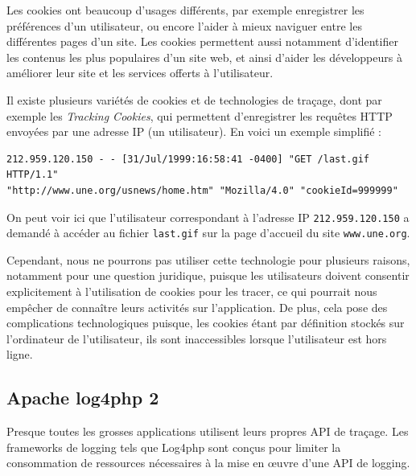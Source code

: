             Les cookies ont beaucoup d'usages différents, par exemple enregistrer les préférences d'un utilisateur, ou encore l'aider à mieux naviguer entre les différentes pages d'un site. Les cookies permettent aussi notamment d'identifier les contenus les plus populaires d'un site web, et ainsi d'aider les développeurs à améliorer leur site et les services offerts à l'utilisateur.
            
            Il existe plusieurs variétés de cookies et de technologies de traçage, dont par exemple les \emph{Tracking Cookies}, qui permettent d'enregistrer les requêtes HTTP envoyées par une adresse IP (un utilisateur). En voici un exemple simplifié : 
{\small			
\begin{verbatim}            
212.959.120.150 - - [31/Jul/1999:16:58:41 -0400] "GET /last.gif HTTP/1.1"
"http://www.une.org/usnews/home.htm" "Mozilla/4.0" "cookieId=999999"
\end{verbatim}
}            
            
            On peut voir ici que l'utilisateur correspondant à l'adresse IP \texttt{212.959.120.150} a demandé à accéder au fichier \texttt{last.gif} sur la page d'accueil du site \texttt{www.une.org}.
            
            Cependant, nous ne pourrons pas utiliser cette technologie pour plusieurs raisons, notamment pour une question juridique, puisque les utilisateurs doivent consentir explicitement à l'utilisation de cookies pour les tracer, ce qui pourrait nous empêcher de connaître leurs activités sur l'application. De plus, cela pose des complications technologiques puisque, les cookies étant par définition stockés sur l'ordinateur de l'utilisateur, ils sont inaccessibles lorsque l'utilisateur est hors ligne.
        
        \subsection{Apache log4php 2}
        
            Presque toutes les grosses applications utilisent leurs propres API de traçage. Les frameworks de logging tels que Log4php sont conçus pour limiter la consommation de ressources nécessaires à la mise en œuvre d'une API de logging.
% 
% 
%
            
